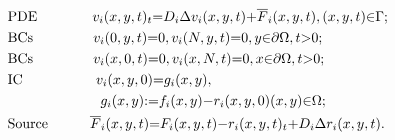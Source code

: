 \documentclass[\main/thesis.tex]{subfiles}
\begin{document}
\begin{align}
	&\text{PDE }    \hspace{0.50in} v_i(x, y, t)_t          {=}  D_i \Delta 
	                                                             v_i(x, y, t)
	                                                        {+} \overline{F}_i(x, y, t), 
	                                (x, y, t) {\in} \Gamma;
	                                \label{eq:carcin_pde_inhomo_v} \\
	&\text{BCs }    \hspace{0.55in} v_i(0, y, t)            {=}  0,
	                                v_i(N, y, t)            {=}  0,
	                                y {\in} \partial \Omega, t {>} 0;
	                                \label{eq:bcs_homo_x} \\
	&\text{BCs }    \hspace{0.55in} v_i(x, 0, t)            {=}  0,
	                                v_i(x, N, t)            {=}  0,
	                                x {\in} \partial \Omega, t {>} 0;
	                                \label{eq:bcs_homo_y} \\
	&\text{IC }     \hspace{0.68in} v_i(x, y, 0)            {=}  g_i(x, y),
	                                \label{eq:ic_inhomo_v} \\
	               &\hspace{0.92in} g_i(x, y)               {:=} f_i(x, y)
	                                                        {-}  r_i(x, y, 0) 
	                                (x, y) {\in} \Omega;
	                                \label{eq:ic_func_inhomo_v} \\
	&\text{Source } \hspace{0.37in} \overline{F}_i(x, y, t) {=}  F_i(x, y, t)
	                                                        {-}  r_i(x, y, t)_t 
	                                                        {+}  D_i \Delta
	                                                             r_i(x, y, t).
	                                \label{eq:source_term_v}
\end{align}
\end{document}
